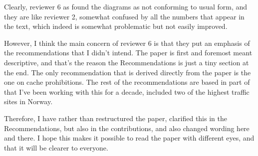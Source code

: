 \documentclass{article}
\begin{document}
Clearly, reviewer 6 as found the diagrams as not conforming to usual
form, and they are like reviewer 2, somewhat confused by all the
numbers that appear in the text, which indeed is somewhat problematic
but not easily improved.

However, I think the main concern of reviewer 6 is that they put an
emphasis of the recommendations that I didn't intend. The paper is
first and foremost meant descriptive, and that's the reason the
Recommendations is just a tiny section at the end. The only
recommendation that is derived directly from the paper is the one on
cache prohibitions. The rest of the recommendations are based in part
of that I've been working with this for a decade, included two of the
highest traffic sites in Norway.

Therefore, I have rather than restructured the paper, clarified this
in the Recommendations, but also in the contributions, and also
changed wording here and there. I hope this makes it possible to read
the paper with different eyes, and that it will be clearer to
everyone.

%

%
%

\end{document}
